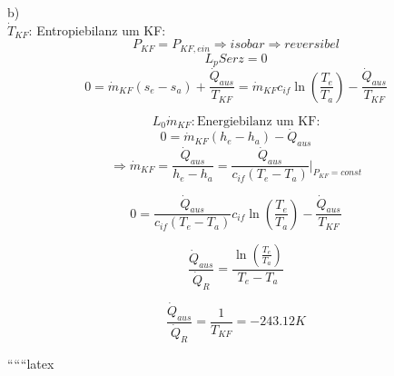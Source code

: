b) \\
\(\dot{T}_{KF}\): Entropiebilanz um KF: \\
\[
P_{KF} = P_{KF,ein} \Rightarrow isobar \Rightarrow reversibel
\]
\[
L_p Serz = 0
\]
\[
0 = \dot{m}_{KF} (s_e - s_a) + \frac{\dot{Q}_{aus}}{T_{KF}} = \dot{m}_{KF} c_{if} \ln \left( \frac{T_e}{T_a} \right) - \frac{\dot{Q}_{aus}}{T_{KF}}
\]

\[
L_0 \dot{m}_{KF}: \text{Energiebilanz um KF:}
\]
\[
0 = \dot{m}_{KF} (h_e - h_a) - \dot{Q}_{aus}
\]
\[
\Rightarrow \dot{m}_{KF} = \frac{\dot{Q}_{aus}}{h_e - h_a} = \frac{\dot{Q}_{aus}}{c_{if} (T_e - T_a)} \bigg|_{P_{KF} = const}
\]

\[
0 = \frac{\dot{Q}_{aus}}{c_{if} (T_e - T_a)} c_{if} \ln \left( \frac{T_e}{T_a} \right) - \frac{\dot{Q}_{aus}}{T_{KF}}
\]

\[
\frac{\dot{Q}_{aus}}{\dot{Q}_R} = \frac{\ln \left( \frac{T_e}{T_a} \right)}{T_e - T_a}
\]

\[
\frac{\dot{Q}_{aus}}{\dot{Q}_R} = \frac{1}{T_{KF}} = -243.12 K
\]

``````latex